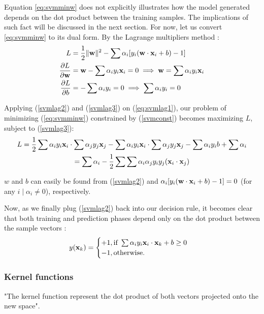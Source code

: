 Equation \ref{eq:svmminw} does not explicitly illustrates how the model generated depends on the dot product between the training samples. The implications of such fact will be discussed in the next section. For now, let us convert \ref{eq:svmminw} to its dual form. By the Lagrange multipliers method \cite{mitsvm}:
\begin{align} \label{eq:svmlag1}
	L &= \frac{1}{2}\|\mathbf{w}\|^2 - \sum \alpha_i[y_i(\mathbf{w} \cdot \mathbf{x}_i +b) -1] \\
	\label{svmlag2}
	\frac{\partial L}{\partial \mathbf{w}} &= \mathbf{w} -\sum\alpha_i y_i \mathbf{x}_i = 0 \implies \mathbf{w} = \sum\alpha_i y_i \mathbf{x}_i \\
	\label{svmlag3}
	\frac{\partial L}{\partial b} &= -\sum\alpha_i y_i = 0 \implies \sum\alpha_i y_i = 0
\end{align}

Applying (\ref{svmlag2}) and (\ref{svmlag3}) on (\ref{eq:svmlag1}), our problem of minimizing (\ref{eq:svmminw}) constrained by (\ref{svmconst}) becomes maximizing $L$, subject to (\ref{svmlag3}):
\begin{gather*}
L = \frac{1}{2}\sum\alpha_i y_i \mathbf{x}_i \cdot \sum\alpha_j y_j \mathbf{x}_j
- \sum \alpha_i y_i \mathbf{x}_i \cdot \sum \alpha_j y_j \mathbf{x}_j
- \sum \alpha_i y_i b + \sum \alpha_i \\
= \sum\alpha_i -\frac{1}{2}\sum\sum\alpha_i\alpha_j y_i y_j (\mathbf{x}_i \cdot \mathbf{x}_j)
\end{gather*}

$w$ and $b$ can easily be found from (\ref{svmlag2}) and $\alpha_i[y_i(\mathbf{w} \cdot \mathbf{x}_i + b) - 1] = 0$ (for any $i \mid \alpha_i \ne 0$), respectively.

Now, as we finally plug (\ref{svmlag2}) back into our decision rule, it becomes clear that both training and prediction phases depend only on the dot product between the sample vectors \cite{mitsvm}:
\begin{align*}
	y(\mathbf{x}_k) = \begin{cases}
		+1, \text{if } \sum\alpha_i y_i \mathbf{x}_i \cdot \mathbf{x}_k +b \geq 0\\
		-1, \text{otherwise.}
	\end{cases}
\end{align*}

\subsubsection{Kernel functions}

"The kernel function represent the dot product of both vectors projected onto the new space". \cite{mitsvm}

